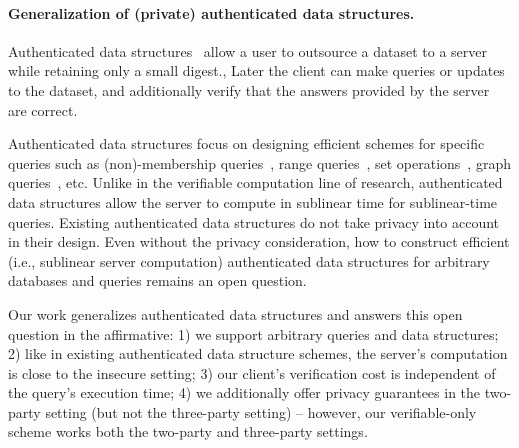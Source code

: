 \paragraph{Generalization of (private) authenticated data structures.}
Authenticated data structures~\cite{nn-crcu-98,GoodrichTS01,cpap-rt-07,ptt-oadsmf-10,ptt-aht-08,sets-auth,dgkmns-faxd-04,graph-auth,DBLP:journals/algorithmica/MartelNDGKS04}
allow a user to outsource a dataset to a server while
retaining only a small digest.,
Later the client can
make queries or updates to the dataset,
and additionally verify that
the answers provided by the server are correct.

Authenticated data structures focus on designing
efficient schemes for specific queries such as
(non)-membership queries~\cite{nn-crcu-98,GoodrichTS01},
range queries~\cite{DBLP:journals/algorithmica/MartelNDGKS04}, set operations~\cite{sets-auth},
graph queries~\cite{graph-auth}, etc.
Unlike in the verifiable computation line of research,
authenticated data structures allow the server to compute
in sublinear time for sublinear-time queries.
Existing authenticated data structures
do not take privacy into account in their design.
Even without the privacy consideration,
how to construct efficient (i.e., sublinear server computation) authenticated data structures
for arbitrary databases and queries
remains an open question.

Our work generalizes authenticated data structures and answers
this open question in the affirmative: 1) we support
arbitrary queries and data structures;
2) like in existing
authenticated data structure schemes, the server's
computation is close to the insecure setting;
3) our client's verification cost is independent of
the query's execution time;
4) we additionally offer privacy guarantees
in the two-party setting (but not the three-party setting) --
however, our verifiable-only scheme works both the two-party
and three-party settings.





